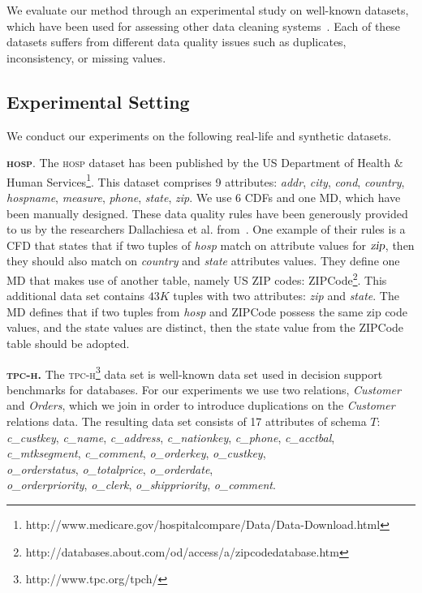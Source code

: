 We evaluate our method through an experimental study on well-known datasets, which have been used for assessing other data cleaning systems~\cite{Dallachiesa:2013:NCD:2463676.2465327, chu2013holistic, llunaticVDLB2013b, bohannon2005cost}. Each of these datasets suffers from different data quality issues such as duplicates, inconsistency, or missing values. 

\subsection{Experimental Setting} 
We conduct our experiments on the following real-life and synthetic datasets.


\textbf{\textsc{hosp}}. The \textsc{hosp} dataset has been published by the US Department of Health $\&$ Human Services\footnote{http://www.medicare.gov/hospitalcompare/Data/Data-Download.html}. This dataset comprises 9 attributes: \textsl{addr}, \textsl{city}, \textsl{cond}, \textsl{country}, \textsl{hospname}, \textsl{measure}, \textsl{phone}, \textsl{state}, \textsl{zip}. 
We use 6 CDFs and one MD, which have been manually designed. These data quality rules have been generously provided to us by the researchers Dallachiesa et al. from~\cite{Dallachiesa:2013:NCD:2463676.2465327}. One example of their rules is a CFD that states that if two tuples of \textsl{hosp} match on attribute values for $\textsl{zip}$, then they should also match on \textsl{country} and \textsl{state} attributes values. They define one MD that makes use of another table, namely US ZIP codes: ZIPCode\footnote{http://databases.about.com/od/access/a/zipcodedatabase.htm}. This additional data set contains $43K$ tuples with two attributes: \textsl{zip} and \textsl{state}. The MD defines that if two tuples from \textsl{hosp} and ZIPCode possess the same zip code values, and the state values are distinct, then the state value from the ZIPCode table should be adopted. 

\textbf{\textsc{tpc-h}.} The \textsc{tpc-h}\footnote{http://www.tpc.org/tpch/} data set is well-known data set used in decision support benchmarks for databases. For our experiments we use two relations, \textit{Customer} and \textit{Orders}, which we join in order to introduce duplications on the \textit{Customer} relations data. The resulting data set consists of 17 attributes of schema $T$: \textsl{c\_custkey}, \textsl{c\_name}, \textsl{c\_address},  \textsl{c\_nationkey}, \textsl{c\_phone}, \textsl{c\_acctbal},\\ \textsl{c\_mtksegment}, \textsl{c\_comment}, \textsl{o\_orderkey}, \textsl{o\_custkey},\\ \textsl{o\_orderstatus}, \textsl{o\_totalprice}, \textsl{o\_orderdate},\\ \textsl{o\_orderpriority}, \textsl{o\_clerk}, \textsl{o\_shippriority}, \textsl{o\_comment}. 

